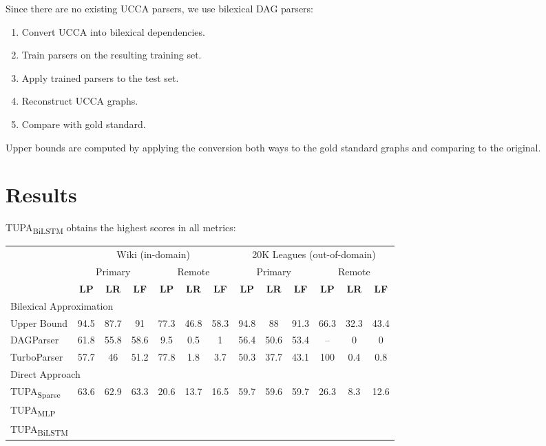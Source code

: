\documentclass[a0,portrait]{a0poster}
\newcommand{\parser}[1]{TUPA\textsubscript{#1}}
\begin{document}
\begin{multicols}{2}
Since there are no existing UCCA parsers, we use bilexical DAG parsers:
\begin{enumerate}
 \item Convert UCCA into bilexical dependencies.
 \item Train parsers on the resulting training set.
 \item Apply trained parsers to the test set.
 \item Reconstruct UCCA graphs.
 \item Compare with gold standard.
\end{enumerate}
Upper bounds are computed by applying
the conversion both ways to the gold standard
graphs and comparing to the original.



\section*{Results}

\parser{BiLSTM} obtains the highest scores in all metrics:
	  
\begin{center}
	\begin{tabular}{l|ccc|ccc||ccc|ccc}
	& \multicolumn{6}{c||}{Wiki (in-domain)} & \multicolumn{6}{c}{20K Leagues (out-of-domain)} \\
	& \multicolumn{3}{c|}{Primary} & \multicolumn{3}{c||}{Remote}
	& \multicolumn{3}{c|}{Primary} & \multicolumn{3}{c}{Remote} \\
	& \textbf{LP} & \textbf{LR} & \textbf{LF} & \textbf{LP} & \textbf{LR} & \textbf{LF}
	& \textbf{LP} & \textbf{LR} & \textbf{LF} & \textbf{LP} & \textbf{LR} & \textbf{LF} \\
	\hline
	\multicolumn{4}{l}{\rule{0pt}{2ex} \footnotesize Bilexical Approximation} \\
	\small Upper Bound
	& \small 94.5 & \small 87.7 & \small 91 & \small 77.3 & \small 46.8 & \small 58.3
	& \small 94.8 & \small 88 & \small 91.3 & \small 66.3 & \small 32.3 & 43.4 \\
	DAGParser \cite{ribeyre-villemontedelaclergerie-seddah:2014:SemEval}
	& 61.8 & 55.8 & 58.6 & 9.5 & 0.5 & 1
	& 56.4 & 50.6 & 53.4 & -- & 0 & 0 \\
	TurboParser \cite{almeida-martins:2015:SemEval}
	& 57.7 & 46 & 51.2 & 77.8 & 1.8 & 3.7
	& 50.3 & 37.7 & 43.1 & 100 & 0.4 & 0.8 \\
	\hline
	\multicolumn{4}{l}{\rule{0pt}{2ex} \footnotesize Direct Approach} \\
	\parser{Sparse}
	& 63.6 & 62.9 & 63.3 & 20.6 & 13.7 & 16.5
	& 59.7 & 59.6 & 59.7 & 26.3 & 8.3 & 12.6 \\
	\parser{MLP}
	&  \\
	\parser{BiLSTM}
	&
	\end{tabular}
\end{center}


\end{multicols}
\end{document}
